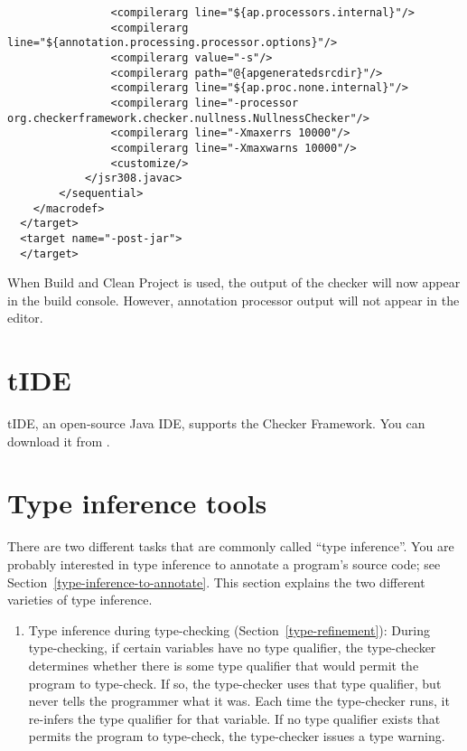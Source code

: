 {\begin{enumerate}
\begin{smaller}
\begin{Verbatim}
                <compilerarg line="${ap.processors.internal}"/>
                <compilerarg line="${annotation.processing.processor.options}"/>
                <compilerarg value="-s"/>
                <compilerarg path="@{apgeneratedsrcdir}"/>
                <compilerarg line="${ap.proc.none.internal}"/>
                <compilerarg line="-processor org.checkerframework.checker.nullness.NullnessChecker"/>
                <compilerarg line="-Xmaxerrs 10000"/>
                <compilerarg line="-Xmaxwarns 10000"/>
                <customize/>
            </jsr308.javac>
        </sequential>
    </macrodef>
  </target>
  <target name="-post-jar">
  </target>
\end{Verbatim}
\end{smaller}

When Build and Clean Project is used, the output of the checker will
now appear in the build console. However, annotation processor output
will not appear in the editor.

\end{enumerate}


\section{tIDE\label{tide}}

\begin{sloppypar}
tIDE, an open-source Java IDE, supports the Checker Framework.
You can download it from .
\end{sloppypar}


\section{Type inference tools\label{type-inference-varieties}}

There are two different tasks that are commonly called ``type inference''.
You are probably interested in type inference to annotate a program's
source code; see Section~\ref{type-inference-to-annotate}.  This section
explains the two different varieties of type inference.

\begin{enumerate}
\item
  Type inference during type-checking (Section~\ref{type-refinement}):
  During type-checking, if certain variables have no type qualifier, the
  type-checker determines whether there is some type qualifier that would
  permit the program to type-check.  If so, the type-checker uses that type
  qualifier, but never tells the programmer what it was.  Each time the
  type-checker runs, it re-infers the type qualifier for that variable.  If
  no type qualifier exists that permits the program to type-check, the
  type-checker issues a type warning.


\end{enumerate}}
